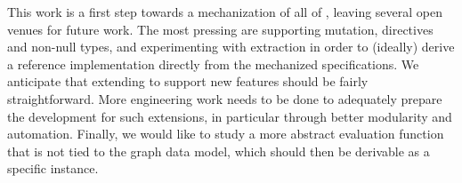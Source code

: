 This work is a first step towards a mechanization of all of \gql, leaving several open venues for future work. The most pressing are supporting mutation, directives and non-null types, and experimenting with extraction in order to (ideally) derive a reference implementation directly from the mechanized specifications. We anticipate that extending \gcoql to support new features should be fairly straightforward. More engineering work needs to be done to adequately prepare the \coq development for such extensions, in particular through better modularity and automation.
%
Finally, we would like to study a more abstract evaluation function that is not tied to the graph data model, which should then be derivable as a specific instance. 


